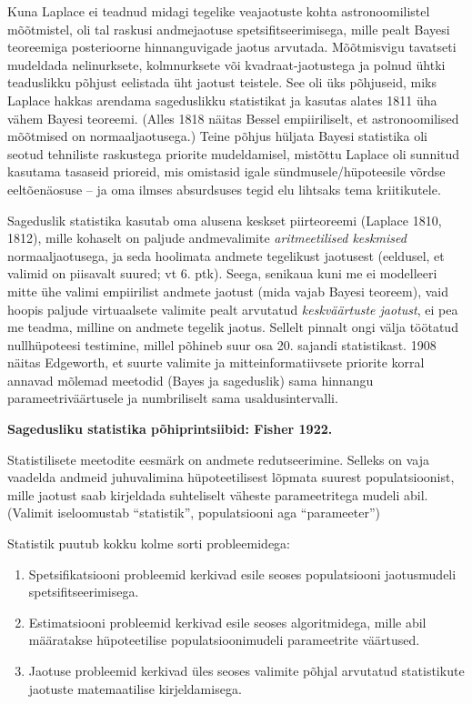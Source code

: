 \documentclass[]{book}
\begin{document}
Kuna Laplace ei teadnud midagi tegelike veajaotuste kohta
astronoomilistel mõõtmistel, oli tal raskusi andmejaotuse
spetsifitseerimisega, mille pealt Bayesi teoreemiga posterioorne
hinnanguvigade jaotus arvutada. Mõõtmisvigu tavatseti mudeldada
nelinurksete, kolmnurksete või kvadraat-jaotustega ja polnud ühtki
teaduslikku põhjust eelistada üht jaotust teistele. See oli üks
põhjuseid, miks Laplace hakkas arendama sageduslikku statistikat ja
kasutas alates 1811 üha vähem Bayesi teoreemi. (Alles 1818 näitas Bessel
empiiriliselt, et astronoomilised mõõtmised on normaaljaotusega.) Teine
põhjus hüljata Bayesi statistika oli seotud tehniliste raskustega
priorite mudeldamisel, mistõttu Laplace oli sunnitud kasutama tasaseid
prioreid, mis omistasid igale sündmusele/hüpoteesile võrdse
eeltõenäosuse -- ja oma ilmses absurdsuses tegid elu lihtsaks tema
kriitikutele.

Sageduslik statistika kasutab oma alusena keskset piirteoreemi (Laplace
1810, 1812), mille kohaselt on paljude andmevalimite
\emph{aritmeetilised keskmised} normaaljaotusega, ja seda hoolimata
andmete tegelikust jaotusest (eeldusel, et valimid on piisavalt suured;
vt 6. ptk). Seega, senikaua kuni me ei modelleeri mitte ühe valimi
empiirilist andmete jaotust (mida vajab Bayesi teoreem), vaid hoopis
paljude virtuaalsete valimite pealt arvutatud \emph{keskväärtuste
jaotust}, ei pea me teadma, milline on andmete tegelik jaotus. Sellelt
pinnalt ongi välja töötatud nullhüpoteesi testimine, millel põhineb suur
osa 20. sajandi statistikast. 1908 näitas Edgeworth, et suurte valimite
ja mitteinformatiivsete priorite korral annavad mõlemad meetodid (Bayes
ja sageduslik) sama hinnangu parameetriväärtusele ja numbriliselt sama
usaldusintervalli.

\textbf{Sagedusliku statistika põhiprintsiibid: Fisher 1922.}

Statistilisete meetodite eesmärk on andmete redutseerimine. Selleks on
vaja vaadelda andmeid juhuvalimina hüpoteetilisest lõpmata suurest
populatsioonist, mille jaotust saab kirjeldada suhteliselt väheste
parameetritega mudeli abil. (Valimit iseloomustab ``statistik'',
populatsiooni aga ``parameeter'')

Statistik puutub kokku kolme sorti probleemidega:

\begin{enumerate}
\def\labelenumi{\arabic{enumi}.}
\item
  Spetsifikatsiooni probleemid kerkivad esile seoses populatsiooni
  jaotusmudeli spetsifitseerimisega.
\item
  Estimatsiooni probleemid kerkivad esile seoses algoritmidega, mille
  abil määratakse hüpoteetilise populatsioonimudeli parameetrite
  väärtused.
\item
  Jaotuse probleemid kerkivad üles seoses valimite põhjal arvutatud
  statistikute jaotuste matemaatilise kirjeldamisega.
\end{enumerate}
\end{document}
